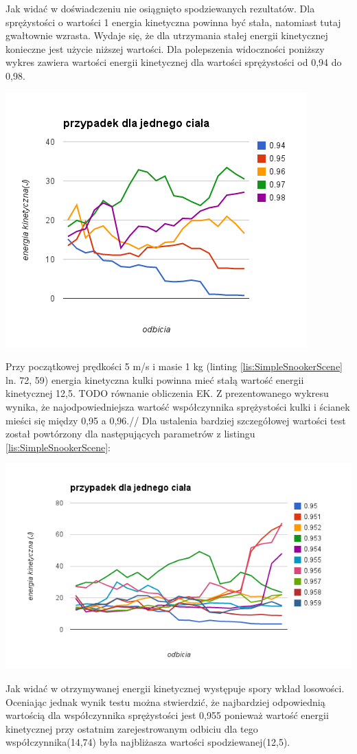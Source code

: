 \documentclass[12pt]{article}
\begin{document}
Jak widać w doświadczeniu nie osiągnięto spodziewanych rezultatów. Dla
sprężystości o wartości 1 energia kinetyczna powinna być stała, natomiast tutaj
gwałtownie wzrasta. Wydaje się, że dla utrzymania stałej energii kinetycznej
konieczne jest użycie niższej wartości. Dla polepszenia widoczności poniższy
wykres zawiera wartości energii kinetycznej dla wartości sprężystości od 0,94 do
0,98.

\includegraphics{./img/chart_2.png}

Przy początkowej prędkości 5 m/s i masie 1 kg (linting
\ref{lis:SimpleSnookerScene} ln. 72, 59) energia kinetyczna kulki powinna mieć
stałą wartość energii kinetycznej 12,5.
TODO równanie obliczenia EK.
Z prezentowanego wykresu wynika, że najodpowiedniejsza wartość współczynnika
sprężystości kulki i ścianek mieści się między 0,95 a 0,96.//
Dla ustalenia bardziej szczegółowej wartości test został powtórzony dla
następujących parametrów z listingu \ref{lis:SimpleSnookerScene}:


  
\includegraphics[width=\textwidth]{./img/chart_3.png}

Jak widać w otrzymywanej energii kinetycznej występuje spory wkład losowości.
Oceniając jednak wynik testu można stwierdzić, że najbardziej odpowiednią
wartością dla współczynnika sprężystości jest 0,955 ponieważ wartość energii
kinetycznej przy ostatnim zarejestrowanym odbiciu dla tego współczynnika(14,74)
była najbliżasza wartości spodziewanej(12,5).
  
\end{document}
